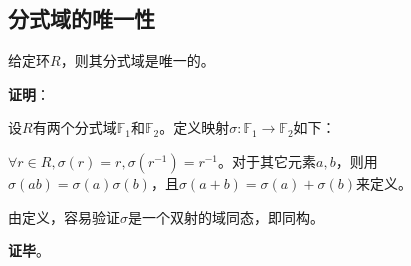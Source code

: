 \subsection{分式域的唯一性}

\begin{theorem}{}\label{FrcFld_the1}
给定环$R$，则其分式域是唯一的。
\end{theorem}

\textbf{证明}：

设$R$有两个分式域$\mathbb{F}_1$和$\mathbb{F}_2$。定义映射$\sigma:\mathbb{F}_1\to\mathbb{F}_2$如下：

$\forall r\in R, \sigma(r)=r, \sigma(r^{-1})=r^{-1}$。对于其它元素$a, b$，则用$\sigma(ab)=\sigma(a)\sigma(b)$，且$\sigma(a+b)=\sigma(a)+\sigma(b)$来定义。

由定义，容易验证$\sigma$是一个双射的域同态，即同构。

\textbf{证毕}。













